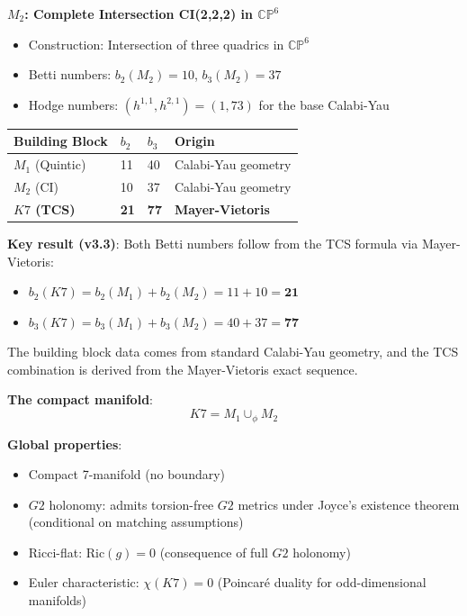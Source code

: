 \documentclass[11pt,a4paper]{article}
\newcommand{\Gtwo}{\mathrm{G}_2}
\newcommand{\Kseven}{K_7}
\def\Gtwo{G2}%
\def\Kseven{K7}%
\begin{document}
\textbf{$M_2$: Complete Intersection CI(2,2,2) in $\mathbb{CP}^6$}
\begin{itemize}
\item Construction: Intersection of three quadrics in $\mathbb{CP}^6$
\item Betti numbers: $b_2(M_2) = 10$, $b_3(M_2) = 37$
\item Hodge numbers: $(h^{1,1}, h^{2,1}) = (1, 73)$ for the base Calabi-Yau
\end{itemize}

\begin{table}[H]
\centering
\begin{tabular}{llll}
\toprule
Building Block & $b_2$ & $b_3$ & Origin \\
\midrule
$M_1$ (Quintic) & 11 & 40 & Calabi-Yau geometry \\
$M_2$ (CI) & 10 & 37 & Calabi-Yau geometry \\
\textbf{$\Kseven$ (TCS)} & \textbf{21} & \textbf{77} & \textbf{Mayer-Vietoris} \\
\bottomrule
\end{tabular}
\end{table}

\textbf{Key result (v3.3)}: Both Betti numbers follow from the TCS formula via Mayer-Vietoris:
\begin{itemize}
\item $b_2(\Kseven) = b_2(M_1) + b_2(M_2) = 11 + 10 = \mathbf{21}$
\item $b_3(\Kseven) = b_3(M_1) + b_3(M_2) = 40 + 37 = \mathbf{77}$
\end{itemize}

The building block data comes from standard Calabi-Yau geometry, and the TCS combination is derived from the Mayer-Vietoris exact sequence.

\textbf{The compact manifold}:
$$\Kseven = M_1 \cup_\phi M_2$$

\textbf{Global properties}:
\begin{itemize}
\item Compact 7-manifold (no boundary)
\item $\Gtwo$ holonomy: admits torsion-free $\Gtwo$ metrics under Joyce's existence theorem (conditional on matching assumptions)
\item Ricci-flat: $\mathrm{Ric}(g) = 0$ (consequence of full $\Gtwo$ holonomy)
\item Euler characteristic: $\chi(\Kseven) = 0$ (Poincar\'e duality for odd-dimensional manifolds)
\end{itemize}
\end{document}
